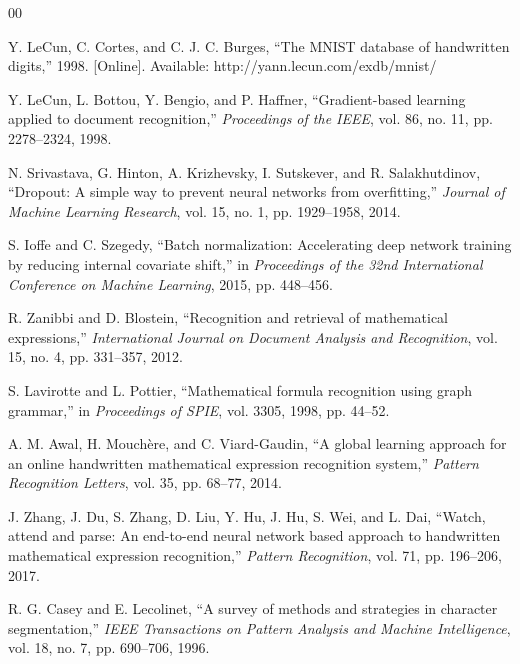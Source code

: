 \documentclass[conference]{IEEEtran}
\begin{document}
\begin{thebibliography}{00}

Y. LeCun, C. Cortes, and C. J. C. Burges, ``The MNIST database of handwritten digits,'' 1998. [Online]. Available: http://yann.lecun.com/exdb/mnist/

Y. LeCun, L. Bottou, Y. Bengio, and P. Haffner, ``Gradient-based learning applied to document recognition,'' \textit{Proceedings of the IEEE}, vol. 86, no. 11, pp. 2278--2324, 1998.

N. Srivastava, G. Hinton, A. Krizhevsky, I. Sutskever, and R. Salakhutdinov, ``Dropout: A simple way to prevent neural networks from overfitting,'' \textit{Journal of Machine Learning Research}, vol. 15, no. 1, pp. 1929--1958, 2014.

S. Ioffe and C. Szegedy, ``Batch normalization: Accelerating deep network training by reducing internal covariate shift,'' in \textit{Proceedings of the 32nd International Conference on Machine Learning}, 2015, pp. 448--456.

R. Zanibbi and D. Blostein, ``Recognition and retrieval of mathematical expressions,'' \textit{International Journal on Document Analysis and Recognition}, vol. 15, no. 4, pp. 331--357, 2012.

S. Lavirotte and L. Pottier, ``Mathematical formula recognition using graph grammar,'' in \textit{Proceedings of SPIE}, vol. 3305, 1998, pp. 44--52.

A. M. Awal, H. Mouchère, and C. Viard-Gaudin, ``A global learning approach for an online handwritten mathematical expression recognition system,'' \textit{Pattern Recognition Letters}, vol. 35, pp. 68--77, 2014.

J. Zhang, J. Du, S. Zhang, D. Liu, Y. Hu, J. Hu, S. Wei, and L. Dai, ``Watch, attend and parse: An end-to-end neural network based approach to handwritten mathematical expression recognition,'' \textit{Pattern Recognition}, vol. 71, pp. 196--206, 2017.

R. G. Casey and E. Lecolinet, ``A survey of methods and strategies in character segmentation,'' \textit{IEEE Transactions on Pattern Analysis and Machine Intelligence}, vol. 18, no. 7, pp. 690--706, 1996.


\end{thebibliography}
\end{document}
